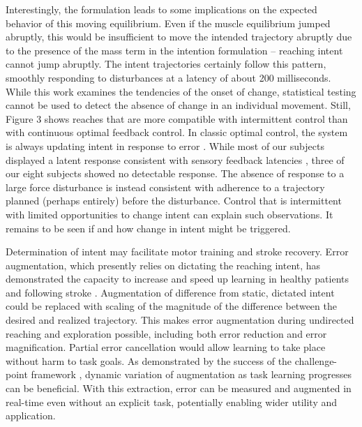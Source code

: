 Interestingly, the formulation leads to some implications on the expected behavior of this moving equilibrium. Even if the muscle equilibrium jumped abruptly, this would be insufficient to move the intended trajectory abruptly due to the presence of the mass term in the intention formulation -- reaching intent cannot jump abruptly. The intent trajectories certainly follow this pattern, smoothly responding to disturbances at a latency of about 200 milliseconds. While this work examines the tendencies of the onset of change, statistical testing cannot be used to detect the absence of change in an individual movement. Still, Figure 3 shows reaches that are more compatible with intermittent control than with continuous optimal feedback control. In classic optimal control, the system is always updating intent in response to error \cite{todorov2002optimal}. While most of our subjects displayed a latent response consistent with sensory feedback latencies \cite{pruszynski2012optimal}, three of our eight subjects showed no detectable response. The absence of response to a large force disturbance is instead consistent with adherence to a trajectory planned (perhaps entirely) before the disturbance. Control that is intermittent \cite{gawthrop2011intermittent} with limited opportunities to change intent can explain such observations. It remains to be seen if and how change in intent might be triggered.

Determination of intent may facilitate motor training and stroke recovery. Error augmentation, which presently relies on dictating the reaching intent, has demonstrated the capacity to increase and speed up learning in healthy patients \cite{patton2004robot} and following stroke \cite{patton2006evaluation}. Augmentation of difference from static, dictated intent could be replaced with scaling of the magnitude of the difference between the desired and realized trajectory. This makes error augmentation during undirected reaching and exploration possible, including both error reduction and error magnification. Partial error cancellation would allow learning to take place without harm to task goals. As demonstrated by the success of the challenge-point framework \cite{guadagnoli2004challenge}, dynamic variation of augmentation as task learning progresses can be beneficial. With this extraction, error can be measured and augmented in real-time even without an explicit task, potentially enabling wider utility and application. 

